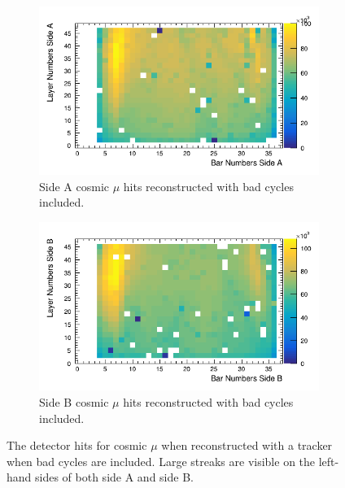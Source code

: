 \begin{figure}[!h]
\centering
\begin{subfigure}{.5\textwidth}
  \centering
  \includegraphics[width=\linewidth]{Chapter5/Figs/Raster/sideAHitsWithBadCycles.png}
  \captionsetup{width=.9\linewidth}
  \caption{Side A cosmic $\mu$ hits reconstructed with bad cycles included.} 
  \label{subFig:sideAHitsWithBadCycles}
\end{subfigure}%
\begin{subfigure}{.5\textwidth}
  \centering
\includegraphics[width=\linewidth]{Chapter5/Figs/Raster/sideBHitsWithBadCycles.png}
  \captionsetup{width=.9\linewidth}
  \caption{Side B cosmic $\mu$ hits reconstructed with bad cycles included.}
  \label{subFig:sideBHitsWithBadCycles}
\end{subfigure}
\caption{The detector hits for cosmic $\mu$ when reconstructed with a tracker when bad cycles are included. Large streaks are visible on the left-hand sides of both side A and side B.}
\label{fig:sideABHitsWithBadCycles}
\end{figure}

